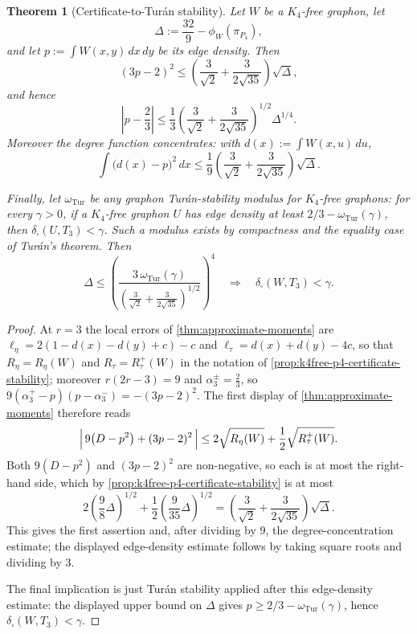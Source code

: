 \documentclass[11pt]{article}
\newtheorem{theorem}{Theorem}
\theoremstyle{definition}
\begin{document}
\begin{theorem}[Certificate-to-Tur\'an stability]\label{thm:k4free-p4-quant-stability}
Let $W$ be a $K_4$-free graphon, let
\[
  \Delta:=\frac{32}{9}-\phi_W(\pi_{P_4}),
\]
and let $p:=\int W(x,y)\,dx\,dy$ be its edge density.  Then
\[
  (3p-2)^2
  \le
  \left(\frac{3}{\sqrt2}+\frac{3}{2\sqrt{35}}\right)\sqrt{\Delta},
\]
and hence
\[
  \left|p-\frac23\right|
  \le
  \frac13
  \left(\frac{3}{\sqrt2}+\frac{3}{2\sqrt{35}}\right)^{1/2}
  \Delta^{1/4}.
\]
Moreover the degree function concentrates: with $d(x):=\int W(x,u)\,du$,
\[
  \int\bigl(d(x)-p\bigr)^2\,dx
  \le
  \frac19\left(\frac{3}{\sqrt2}+\frac{3}{2\sqrt{35}}\right)\sqrt{\Delta}.
\]

Finally, let $\omega_{\mathrm{Tur}}$ be any graphon Tur\'an-stability modulus for
$K_4$-free graphons: for every $\gamma>0$, if a $K_4$-free graphon $U$ has edge
density at least $2/3-\omega_{\mathrm{Tur}}(\gamma)$, then
$\delta_\square(U,T_3)<\gamma$.  Such a modulus exists by compactness and the equality
case of Tur\'an's theorem.  Then
\[
  \Delta
  \le
  \left(
    \frac{3\,\omega_{\mathrm{Tur}}(\gamma)}
    {\left(\frac{3}{\sqrt2}+\frac{3}{2\sqrt{35}}\right)^{1/2}}
  \right)^4
  \quad\Longrightarrow\quad
  \delta_\square(W,T_3)<\gamma .
\]
\end{theorem}

\begin{proof}
At $r=3$ the local errors of \cref{thm:approximate-moments} are
$\ell_\eta=2(1-d(x)-d(y)+c)-c$ and $\ell_\tau=d(x)+d(y)-4c$, so that
$R_\eta=R_\eta(W)$ and $R_\tau=R_\tau^{+}(W)$ in the notation of
\cref{prop:k4free-p4-certificate-stability}; moreover $r(2r-3)=9$ and
$\alpha_3^\pm=\frac23$, so $9(\alpha_3^+-p)(p-\alpha_3^-)=-(3p-2)^2$.  The first display
of \cref{thm:approximate-moments} therefore reads
\[
  \Bigl|\,9\bigl(D-p^2\bigr)+(3p-2)^2\,\Bigr|
  \le
  2\sqrt{R_\eta(W)}+\frac12\sqrt{R_\tau^{+}(W)} .
\]
Both $9(D-p^2)$ and $(3p-2)^2$ are non-negative, so each is at most the right-hand side,
which by \cref{prop:k4free-p4-certificate-stability} is at most
\[
  2\left(\frac98\Delta\right)^{1/2}
  +\frac12\left(\frac9{35}\Delta\right)^{1/2}
  =
  \left(\frac{3}{\sqrt2}+\frac{3}{2\sqrt{35}}\right)\sqrt{\Delta}.
\]
This gives the first assertion and, after dividing by $9$, the degree-concentration
estimate; the displayed edge-density estimate follows by taking square roots and
dividing by $3$.

The final implication is just Tur\'an stability applied after this edge-density estimate:
the displayed upper bound on $\Delta$ gives
$p\ge2/3-\omega_{\mathrm{Tur}}(\gamma)$, hence
$\delta_\square(W,T_3)<\gamma$.
\end{proof}
\end{document}
